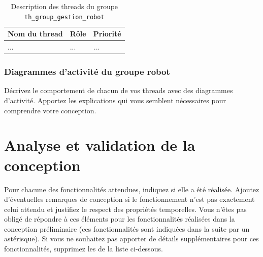 \documentclass[11pt, a4paper]{paper}
\begin{document}
\begin{table}[htp]
\caption{Description des threads du groupe {\tt th\_group\_gestion\_robot}}
\begin{center}
\begin{tabular}{|p{3cm}|p{8.5cm}|p{2cm}|}
\hline
\bf Nom du thread &	\bf Rôle &	\bf Priorité \\
\hline
\hline
\color{blue}... &	\color{blue}... &	\color{blue}...\\
\hline
\end{tabular}
\end{center}
\label{tab:gt_moniteur}
\end{table}%
\FloatBarrier

\subsubsection{Diagrammes d'activité du groupe robot}
{\color{blue}Décrivez le comportement de chacun de vos threads avec des diagrammes d'activité. Apportez les explications qui vous semblent nécessaires pour comprendre votre conception.}


\section{Analyse et validation de la conception}

{\color{red}Pour chacune des fonctionnalités attendues, indiquez si elle a été réalisée. Ajoutez d'éventuelles remarques de conception si le fonctionnement n'est pas exactement celui attendu et justifiez le respect des propriétés temporelles. Vous n'êtes pas obligé de répondre à ces éléments pour les fonctionnalités réalisées dans la conception préliminaire (ces fonctionnalités sont indiquées dans la suite par un astérisque). Si vous ne souhaitez pas apporter de détails supplémentaires pour ces fonctionnalités, supprimez les de la liste ci-dessous.}
\end{document}
